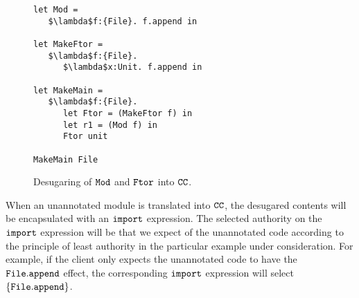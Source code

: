 \begin{figure}[h]

\begin{lstlisting}
let Mod =
   $\lambda$f:{File}. f.append in

let MakeFtor =
   $\lambda$f:{File}.
      $\lambda$x:Unit. f.append in

let MakeMain =
   $\lambda$f:{File}.
      let Ftor = (MakeFtor f) in
      let r1 = (Mod f) in
      Ftor unit

MakeMain File
\end{lstlisting}

\caption{Desugaring of $\mathtt{Mod}$ and $\mathtt{Ftor}$ into $\mathtt{CC}$.}
\label{fig:wyv_tutorial_desugaring}
\end{figure}

When an unannotated module is translated into $\mathtt{CC}$, the desugared contents will be encapsulated with an $\mathtt{import}$ expression. The selected authority on the $\mathtt{import}$ expression will be that we expect of the unannotated code according to the principle of least authority in the particular example under consideration. For example, if the client only expects the unannotated code to have the $\mathtt{File.append}$ effect, the corresponding $\mathtt{import}$ expression will select $\mathtt{\{File.append\}}$.